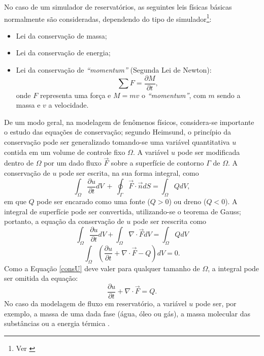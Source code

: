 No caso de um simulador de reservat\'{o}rios, as seguintes leis f\'{i}sicas b\'{a}sicas normalmente s\~{a}o consideradas, dependendo do tipo de simulador\footnote{Ver \cite[p. 520]{engres}}:

\begin{itemize}
\item Lei da conserva\c{c}\~{a}o de massa;
\item Lei da conserva\c{c}\~{a}o de energia;
\item Lei da conserva\c{c}\~{a}o de \textit{``momentum''} (Segunda Lei de Newton):
\begin{equation}
\sum F = \frac{\partial M}{\partial t},
\end{equation}
onde $F$ representa uma for\c{c}a e $M = mv$ o \textit{``momentum''}, com $m$ sendo a massa e $v$ a velocidade.
\end{itemize}

De um modo geral, na modelagem de fenômenos físicos, considera-se importante o estudo das equações de conservação; segundo Heimsund, o princípio da conservação pode ser generalizado tomando-se uma variável quantitativa $u$ contida em um volume de controle fixo $\Omega$. A variável $u$ pode ser modificada dentro de $\Omega$ por um dado fluxo $\vec{F}$ sobre a superfície de contorno $\Gamma$ de $\Omega$. A conservação de $u$ pode ser escrita, na sua forma integral, como
\begin{equation}
	\int_{\Omega} \frac{\partial u}{\partial t}dV ~+~\oint_{\Gamma}\vec{F}\cdot\vec{n}dS = \int_{\Omega} Q dV,
\end{equation}
em que $Q$ pode ser encarado como uma fonte ($Q > 0$) ou dreno ($Q < 0$). A integral de superfície pode ser convertida, utilizando-se o teorema de Gauss; portanto, a equação da conservação de $u$ pode ser reescrita como
\begin{equation}
\int_{\Omega} \frac{\partial u}{\partial t}dV + \int_{\Omega} \nabla\cdot\vec{F} dV = \int_{\Omega}Q dV
\end{equation}
\begin{equation}\label{consU}
\int_{\Omega} \left(\frac{\partial u}{\partial t} + \nabla\cdot\vec{F} - Q \right)dV = 0.
\end{equation}
Como a Equação \eqref{consU} deve valer para qualquer tamanho de $\Omega$, a integral pode ser omitida da equação:
\begin{equation}\label{consU2}
\frac{\partial u}{\partial t} + \nabla\cdot\vec{F} = Q.
\end{equation}
No caso da modelagem de fluxo em reservatório, a variável $u$ pode ser, por exemplo, a massa de uma dada fase (água, óleo ou gás), a massa molecular das substâncias ou a energia térmica \cite{heimsund2005}.

